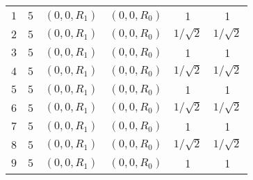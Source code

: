 \begin{center}
\begin{longtable}{c c c c c c}
	$1$		&	$5$	&	$(0, 0, R_1)$		&	$(0, 0, R_0)$		& 1 			& 1				\\
	$2$		&	$5$	&	$(0, 0, R_1)$		&	$(0, 0, R_0)$ 		& $1/\sqrt{2}$ 	& $1/\sqrt{2}$ 	\\
	$3$		&	$5$	&	$(0, 0, R_1)$		&	$(0, 0, R_0)$		& 1 			& 1				\\
	$4$		&	$5$	&	$(0, 0, R_1)$		&	$(0, 0, R_0)$		& $1/\sqrt{2}$ 	& $1/\sqrt{2}$ 	\\
	$5$		&	$5$	&	$(0, 0, R_1)$		&	$(0, 0, R_0)$		& 1 			& 1				\\
	$6$		&	$5$	&	$(0, 0, R_1)$		&	$(0, 0, R_0)$		& $1/\sqrt{2}$ 	& $1/\sqrt{2}$ 	\\
	$7$		&	$5$	&	$(0, 0, R_1)$		&	$(0, 0, R_0)$		& 1 			& 1				\\
	$8$		&	$5$	&	$(0, 0, R_1)$		&	$(0, 0, R_0)$		& $1/\sqrt{2}$ 	& $1/\sqrt{2}$ 	\\
	$9$		&	$5$	&	$(0, 0, R_1)$		&	$(0, 0, R_0)$		& 1 			& 1				\\
\end{longtable}
\end{center}

